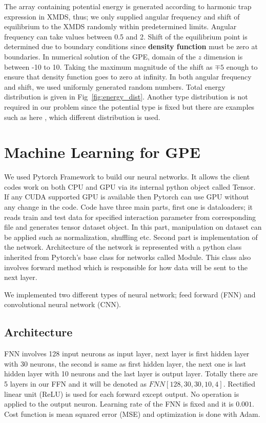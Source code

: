 \documentclass[a4paper,times,12pt]{article}
\begin{document}
The array containing potential energy is generated according to harmonic trap expression in XMDS, thus; we only supplied angular frequency and shift of equilibrium to the XMDS randomly within predetermined limits. Angular frequency can take values between 0.5 and 2. Shift of the equilibrium point is determined due to boundary conditions since \textbf{density function} must be zero at boundaries. In numerical solution of the GPE, domain of the $z$ dimension is between -10 to 10. Taking the maximum magnitude of the shift as $\mp 5$ enough to ensure that density function goes to zero at infinity. In both angular frequency and shift, we used uniformly generated random numbers. Total energy distribution is given in Fig~\ref{fig:energy_dist}. Another type distribution is not required in our problem since the potential type is fixed but there are examples such as here \cite{mills2017deep}, which different distribution is used.

\section{Machine Learning for GPE}

We used Pytorch Framework \cite{paszke2017automatic} to build our neural networks. It allows the client codes work on both CPU and GPU via its internal python object called Tensor. If any CUDA supported GPU is available then Pytorch can use GPU without any change in the code. Code have three main parts, first one is dataloaders; it reads train and test data for specified interaction parameter from corresponding file and generates tensor dataset object. In this part, manipulation on dataset can be applied such as normalization, shuffling etc. Second part is implementation of the network. Architecture of the network is represented with a python class inherited from Pytorch's base class for networks called Module. This class also involves forward method which is responsible for how data will be sent to the next layer. 


We implemented two different types of neural network; feed forward (FNN) and convolutional neural network (CNN).


\subsection{Architecture}

FNN involves 128 input neurons as input layer, next layer is first hidden layer with 30 neurons, the second is same as first hidden layer, the next one is last hidden layer with 10 neurons and the last layer is output layer. Totally there are 5 layers in our FFN and it will be denoted as $FNN[128, 30, 30, 10, 4]$. Rectified linear unit (ReLU) is used for each forward except output. No operation is applied to the output neuron. Learning rate of the FNN is fixed and it is $0.001$. Cost function is mean squared error (MSE) and optimization is done with Adam. 
\end{document}
